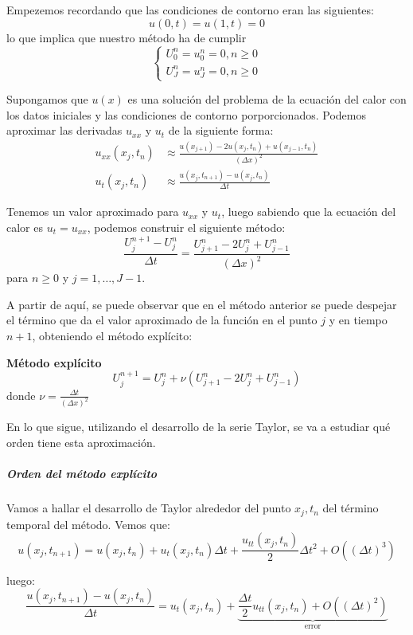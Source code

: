 Empezemos recordando que las condiciones de contorno eran las siguientes:
$$u(0,t) = u(1,t) = 0$$
lo que implica que nuestro método ha de cumplir
\begin{equation*}
	\left\{
	\begin{array}{l}
	U_0^n = u_0^n = 0, n\ge 0\\
	U_J^n = u_J^n = 0, n\ge 0
	\end{array}
	\right.
\end{equation*}

Supongamos que $u(x)$ es una solución del problema de la ecuación del calor con los datos iniciales y las condiciones de contorno porporcionados. Podemos aproximar las derivadas $u_{xx}$ y $u_t$ de la siguiente forma:
\begin{align*}
		u_{xx}(x_j, t_n) &\approx \frac{u(x_{j+1}) - 2u(x_j, t_n) + u(x_{j-1}, t_n)}{(\Delta x)^2}\\
		u_t(x_j, t_n) &\approx \frac{u(x_j, t_{n+1})-u(x_j,t_n)}{\Delta t}
\end{align*}

Tenemos un valor aproximado para $u_{xx}$ y $u_t$, luego sabiendo que la ecuación del calor es $u_t = u_{xx}$, podemos construir el siguiente método:
\begin{equation*}
	\frac{U_j^{n+1}-U_j^n}{\Delta t} =  \frac{U_{j+1}^n-2U_j^n+U_{j-1}^n}{(\Delta x)^2}
\end{equation*}
para $n\ge  0$ y $j=1,\hdots ,J-1$.

A partir de aquí, se puede observar que en el método anterior se puede despejar el término que da el valor aproximado de la función en el punto $j$ y en tiempo $n+1$, obteniendo el método explícito:

\begin{mdframed}
	\textbf{Método explícito}
	$$U_j^{n+1} = U_j^n+\nu\left(U_{j+1}^n - 2 U_j^n + U_{j-1}^n\right)$$
	donde $\nu = \frac{\Delta t}{(\Delta x )^2}$
\end{mdframed}

En lo que sigue, utilizando el desarrollo de la serie Taylor, se va a estudiar qué orden tiene esta aproximación.

\subparagraph{Orden del método explícito} 
\mbox{}

Vamos a hallar el desarrollo de Taylor alrededor del punto $x_j, t_n$ del término temporal del método. Vemos que:
$$u(x_j, t_{n+1}) = u(x_j, t_n) + u_t(x_j, t_n)\Delta t +\frac{u_{tt} (x_j,t_n)}{2}\Delta t ^2 + O\left((\Delta t)^3\right)$$

luego:
$$\frac{u(x_j,t_{n+1}) - u(x_j, t_n)}{\Delta t} = u_t(x_j,t_n) + \underbrace{\frac{\Delta t}{2} u_{tt}(x_j,t_n) + O\left((\Delta t)^2\right)}_{\text{error}}$$


